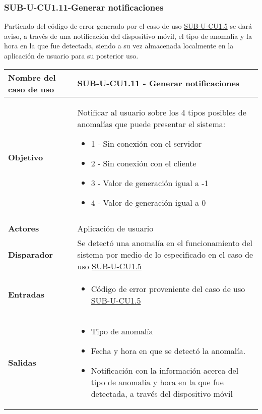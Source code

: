 \subsubsection{SUB-U-CU1.11-Generar notificaciones}\label{SUB-U-CU1.11}
Partiendo del código de error generado por el caso de uso \hyperref[SUB-U-CU1.5]{SUB-U-CU1.5} se dará aviso, a través de una notificación del dispositivo móvil, el tipo de anomalía y la hora en la que fue detectada, siendo a su vez almacenada localmente en la aplicación de usuario para su posterior uso.  


\begin{longtable}{|J{5cm}|J{10.3cm}|}
	\hline
	\textbf{Nombre del caso de uso} &
		SUB-U-CU1.11 - Generar notificaciones
 \\ \hline
	\textbf{Objetivo} &
		Notificar al usuario sobre los 4 tipos posibles de anomalías que puede presentar el sistema:
		\begin{itemize}
			\item 1 - Sin conexión con el servidor
			\item 2 - Sin conexión con el cliente
			\item 3 - Valor de generación igual a -1
			\item 4 - Valor de generación igual a 0
		\end{itemize} \\ \hline
 \\ \hline
	\textbf{Actores} &
		Aplicación de usuario \\ \hline 
	\textbf{Disparador} & 
		Se detectó una anomalía en el funcionamiento del sistema por medio de lo especificado en el caso de uso \hyperref[SUB-U-CU1.5]{SUB-U-CU1.5}  \\ \hline 
	\textbf{Entradas} & 
		\begin{itemize}
				\item Código de error proveniente del caso de uso \hyperref[SUB-U-CU1.5]{SUB-U-CU1.5}
		\end{itemize}\\ \hline 
	\textbf{Salidas} & 
		\begin{itemize}
		    \item Tipo de anomalía
			\item Fecha y hora en que se detectó la anomalía.
			\item Notificación con la información acerca del tipo de anomalía y hora en la que fue detectada, a través del dispositivo móvil
		\end{itemize} \\ \hline

\end{longtable}
